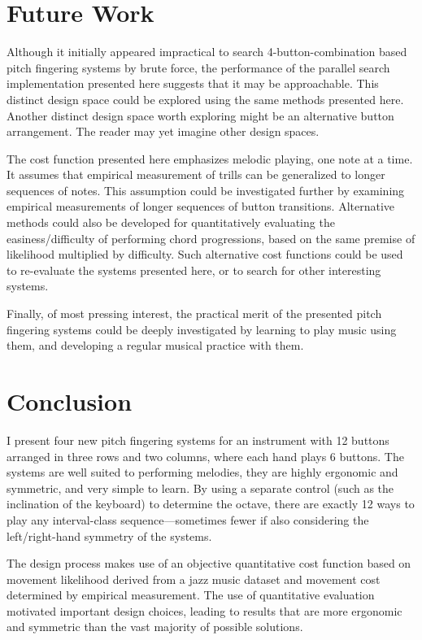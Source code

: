 \documentclass[sigconf]{nimeart}
\begin{document}
\section{Future Work}\label{future-work}

Although it initially appeared impractical to search 4-button-combination based pitch fingering systems by brute force, the performance of the parallel search implementation presented here suggests that it may be approachable. This distinct design space could be explored using the same methods presented here. Another distinct design space worth exploring might be an alternative button arrangement. The reader may yet imagine other design spaces.

The cost function presented here emphasizes melodic playing, one note at a time. It assumes that empirical measurement of trills can be generalized to longer sequences of notes. This assumption could be investigated further by examining empirical measurements of longer sequences of button transitions. Alternative methods could also be developed for quantitatively evaluating the easiness/difficulty of performing chord progressions, based on the same premise of likelihood multiplied by difficulty. Such alternative cost functions could be used to re-evaluate the systems presented here, or to search for other interesting systems.

Finally, of most pressing interest, the practical merit of the presented pitch fingering systems could be deeply investigated by learning to play music using them, and developing a regular musical practice with them.

\section{Conclusion}\label{conclusion}

I present four new pitch fingering systems for an instrument with 12 buttons arranged in three rows and two columns, where each hand plays 6 buttons. The systems are well suited to performing melodies, they are highly ergonomic and symmetric, and very simple to learn. By using a separate control (such as the inclination of the keyboard) to determine the octave, there are exactly 12 ways to play any interval-class sequence---sometimes fewer if also considering the left/right-hand symmetry of the systems.

The design process makes use of an objective quantitative cost function based on movement likelihood derived from a jazz music dataset and movement cost determined by empirical measurement. The use of quantitative evaluation motivated important design choices, leading to results that are more ergonomic and symmetric than the vast majority of possible solutions.
\end{document}
